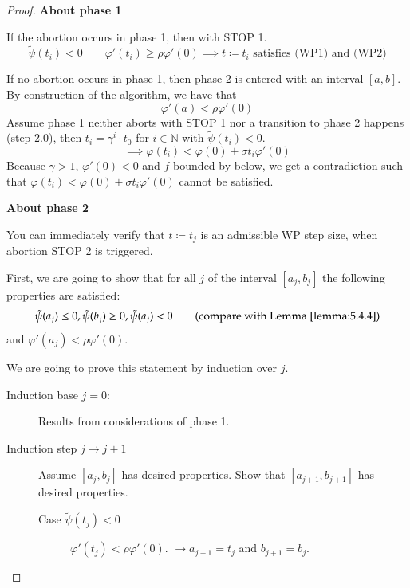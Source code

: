 \documentclass[a4paper]{article}
\numberwithin{lecref}{subsection}
\begin{document}
\begin{proof}
	\textbf{About phase 1}

	If the abortion occurs in phase 1, then with STOP 1.
	\[ \tilde \psi(t_i) < 0 \qquad \varphi'(t_i) \geq \rho \varphi'(0) \implies t \coloneqq t_i \text{ satisfies (WP1) and (WP2)} \]

	If no abortion occurs in phase 1, then phase 2 is entered with an interval $[a, b]$.
	By construction of the algorithm, we have that
	\[ \varphi'(a) < \rho \varphi'(0) \]
	Assume phase 1 neither aborts with STOP 1 nor a transition to phase 2 happens (step 2.0),
	then $t_i = \gamma^i \cdot t_0$ for $i \in \mathbb N$ with $\tilde \psi(t_i) < 0$.
	\[ \implies \varphi(t_i) < \varphi(0) + \sigma t_i \varphi'(0) \]
	Because $\gamma > 1$, $\varphi'(0) < 0$ and $f$ bounded by below, we get a contradiction such that $\varphi(t_i) < \varphi(0) + \sigma t_i \varphi'(0)$ cannot be satisfied.

	\textbf{About phase 2}

	You can immediately verify that $t \coloneqq t_j$ is an admissible WP step size, when abortion STOP 2 is triggered.

	First, we are going to show that for all $j$ of the interval $[a_j, b_j]$ the following properties are satisfied:
	\[ \tilde\psi(a_j) \leq 0, \tilde\psi(b_j) \geq 0, \tilde\psi(a_j) < 0 \qquad \text{(compare with Lemma~\ref{lemma:5.4.4})} \]
	and $\varphi'(a_j) < \rho \varphi'(0)$.

	We are going to prove this statement by induction over $j$.

	\begin{description}
		\item[Induction base $j=0$:]
			Results from considerations of phase 1.
		\item[Induction step $j \to j+1$]
			Assume $[a_j, b_j]$ has desired properties.
			Show that $[a_{j+1}, b_{j+1}]$ has desired properties.

			\begin{description}
				\item[Case $\tilde\psi(t_j) < 0$] 
					$\varphi'(t_j) < \rho \varphi'(0)$.
					$\to a_{j+1} = t_j$ and $b_{j+1} = b_j$.


\end{description}
\end{description}
\end{proof}
\end{document}
